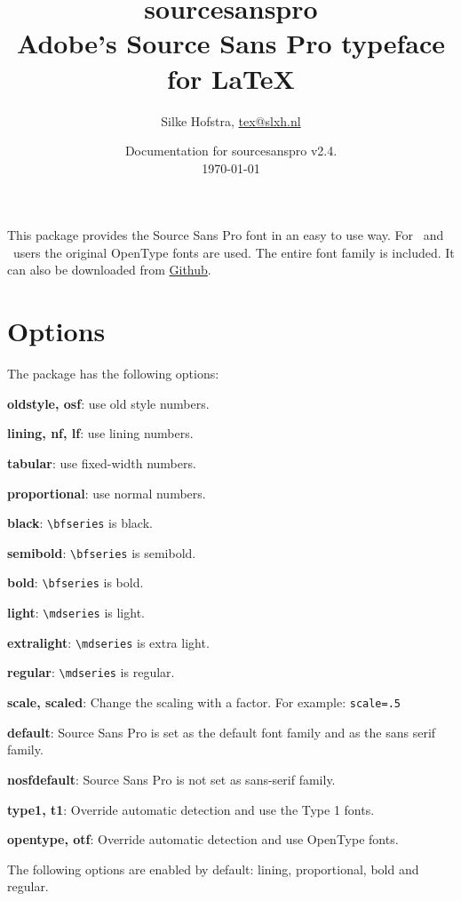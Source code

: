\documentclass[11pt,a4paper,english]{article}
\title{\bfseries
	\Huge sourcesanspro\\
	\Large Adobe's Source Sans Pro typeface for \LaTeX
}
\author{Silke Hofstra, \href{mailto:tex@slxh.nl}{tex@slxh.nl}}
\date{Documentation for sourcesanspro v2.4.\\ \today}
\begin{document}
\maketitle
\begin{multicols}{2}
This package provides the Source Sans Pro font in an easy to use way. For \XeLaTeX\ and \LuaLaTeX\ users the original OpenType fonts are used. The entire font family is included. It can also be downloaded from \href{https://github.com/adobe/source-sans-pro}{Github}.

\section{Options}
The package has the following options:
\begin{itemize*}
	\item \textbf{oldstyle, osf}:  use old style numbers.
	\item \textbf{lining, nf, lf}: use lining numbers.
	\item \textbf{tabular}:        use fixed-width numbers.
	\item \textbf{proportional}:   use normal numbers.
	\item \textbf{black}:          \texttt{\textbackslash bfseries} is black.
	\item \textbf{semibold}:       \texttt{\textbackslash bfseries} is semibold.
	\item \textbf{bold}:           \texttt{\textbackslash bfseries} is bold.
	\item \textbf{light}:          \texttt{\textbackslash mdseries} is light.
	\item \textbf{extralight}:     \texttt{\textbackslash mdseries} is extra light.
	\item \textbf{regular}:        \texttt{\textbackslash mdseries} is regular.
	\item \textbf{scale, scaled}:  Change the scaling with a factor. For example:  \texttt{scale=.5}
	\item \textbf{default}:        Source Sans Pro is set as the default font family and as the sans serif family.
	\item \textbf{nosfdefault}:    Source Sans Pro is not set as sans-serif family.
	\item \textbf{type1, t1}:      Override automatic detection and use the Type 1 fonts.
	\item \textbf{opentype, otf}:  Override automatic detection and use OpenType fonts.
\end{itemize*}
The following options are enabled by default: lining, proportional, bold and regular.


\end{multicols}
\end{document}
